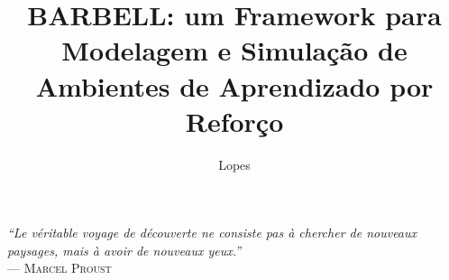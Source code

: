 \documentclass[cic,tc]{iiufrgs}
\title{BARBELL: um Framework para Modelagem e Simulação de Ambientes de Aprendizado por Reforço}
\author{Lopes}{Henrique de Paula}
\newcommand\bruno[1]{\textcolor{magenta}{#1}}
\begin{document}
\maketitle

\clearpage
\begin{flushright}
    \mbox{}\vfill
    {\sffamily\itshape
      ``Le véritable voyage de découverte ne consiste pas à chercher de nouveaux paysages,
      mais à avoir de nouveaux yeux.''\\}
    --- \textsc{Marcel Proust}
\end{flushright}


\end{document}
